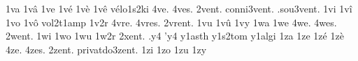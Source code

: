 {%
1va
1v\^a
1ve
1v\'e
1v\`e
1v\^e
                    v\'elo1s2ki
4ve.
4ves.
     2vent.
conni3vent.
 .sou3vent.
%
1vi
1v\^i
1vo
1v\^o
                    vol2t1amp
1v2r
4vre.
4vres.
2vrent. %
1vu
1v\^u
1vy
1wa
1we
4we.
4wes.
2went. %
1wi
1wo
1wu
1w2r
2xent. %
.y4
'y4
                    y1asth
                    y1s2tom
                    y1algi
1za
1ze
1z\'e
1z\`e
4ze.
4zes.
        2zent.
privatdo3zent.
%
1zi
1zo
1zu
1zy
}
\endgroup
\endinput
